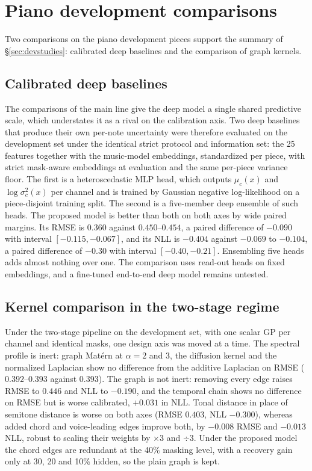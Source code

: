 \documentclass[11pt,a4paper]{report}
\begin{document}
\chapter{Piano development comparisons}\label{app:phase1dev}
Two comparisons on the piano development pieces support the summary of
\S\ref{sec:devstudies}: calibrated deep baselines and the comparison of
graph kernels.

\section{Calibrated deep baselines}
The comparisons of the main line give the deep model a single shared
predictive scale, which understates it as a rival on the calibration axis.
Two deep baselines that produce their own per-note uncertainty were
therefore evaluated on the development set under the identical strict
protocol and information set: the 25 features together with the music-model
embeddings, standardized per piece, with strict mask-aware embeddings at
evaluation and the same per-piece variance floor. The first is a
heteroscedastic MLP head, which outputs $\mu_c(x)$ and $\log\sigma_c^2(x)$
per channel and is trained by Gaussian negative log-likelihood on a
piece-disjoint training split. The second is a five-member deep ensemble of such heads. The
proposed model is better than both on both axes by wide paired margins. Its
RMSE is $0.360$ against $0.450$--$0.454$, a paired difference of $-0.090$
with interval $[-0.115, -0.067]$, and its NLL is $-0.404$ against $-0.069$
to $-0.104$, a paired difference of $-0.30$ with interval $[-0.40, -0.21]$.
Ensembling five heads adds almost nothing over one. The comparison uses
read-out heads on fixed embeddings, and a fine-tuned end-to-end deep model
remains untested.

\section{Kernel comparison in the two-stage regime}\label{sec:kernels}
Under the two-stage pipeline on the development set, with one scalar GP per
channel and identical masks, one design axis was moved at a time. The
spectral profile is inert: graph Mat\'ern at $\alpha = 2$ and $3$, the
diffusion kernel and the normalized Laplacian show no difference from the
additive Laplacian on RMSE ($0.392$--$0.393$ against $0.393$). The graph is
not inert: removing every edge raises RMSE to $0.446$ and NLL to $-0.190$,
and the temporal chain shows no difference on RMSE but is worse calibrated, $+0.031$ in
NLL. Tonal distance in place of semitone distance is worse on both axes
(RMSE $0.403$, NLL $-0.300$), whereas added chord and voice-leading edges
improve both, by $-0.008$ RMSE and $-0.013$ NLL, robust to scaling their
weights by $\times 3$ and $\div 3$. Under the proposed model the chord edges
are redundant at the 40\% masking level, with a recovery gain only at
30, 20 and 10\% hidden, so the plain graph is kept.
\end{document}
